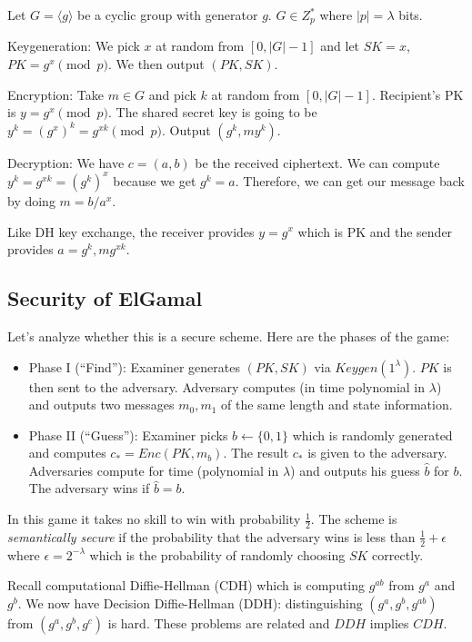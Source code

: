 \documentclass[psamsfonts]{amsart}
\begin{document}
Let $G = \langle g \rangle$ be a cyclic group with generator $g$. $G \in Z_p^*$ where $|p| = \lambda$ bits. 

Keygeneration: We pick $x$ at random from $[0, |G| - 1]$ and let $SK = x$, $PK = g^x \pmod{p}$. We then output $(PK, SK)$.

Encryption: Take $m \in G$ and pick $k$ at random from $[0, |G| -1]$. Recipient's PK is $y = g^x \pmod{p}$. The shared secret key is going to be $y^k = (g^{x})^k = g^{xk} \pmod{p}$. Output $(g^k, m y^k)$.

Decryption: We have $c = (a,b)$ be the received ciphertext. We can compute $y^k = g^{xk} = (g^k)^x$ because we get $g^k = a$. Therefore, we can get our message back by doing $m = b/a^x$.

Like DH key exchange, the receiver provides $y = g^{x}$ which is PK and the sender provides $a=g^k, m g^{xk}$.

\subsection{Security of ElGamal}

Let's analyze whether this is a secure scheme. Here are the phases of the game:

\begin{itemize}
  \item Phase I (``Find''): Examiner generates $(PK, SK)$ via $Keygen(1^{\lambda})$. $PK$ is then sent to the adversary. Adversary computes (in time polynomial in $\lambda$) and outputs two messages $m_0, m_1$ of the same length and state information.
  \item Phase II (``Guess''): Examiner picks $b \leftarrow \{0,1\}$ which is randomly generated and computes $c_{*} = Enc(PK, m_b)$. The result $c_*$ is given to the adversary. Adversaries compute for time (polynomial in $\lambda$) and outputs his guess $\hat{b}$ for $b$. The adversary wins if $\hat{b} = b$.
\end{itemize}

In this game it takes no skill to win with probability $\frac{1}{2}$. The scheme is \emph{semantically secure} if the probability that the adversary wins is less than $\frac{1}{2} + \epsilon$ where $\epsilon = 2^{-\lambda}$ which is the probability of randomly choosing $SK$ correctly.

Recall computational Diffie-Hellman (CDH) which is computing $g^{ab}$ from $g^a$ and $g^b$. We now have Decision Diffie-Hellman (DDH): distinguishing $(g^a, g^b, g^{ab})$ from $(g^a, g^b, g^c)$ is hard. These problems are related and $DDH$ implies $CDH$. 
\end{document}
